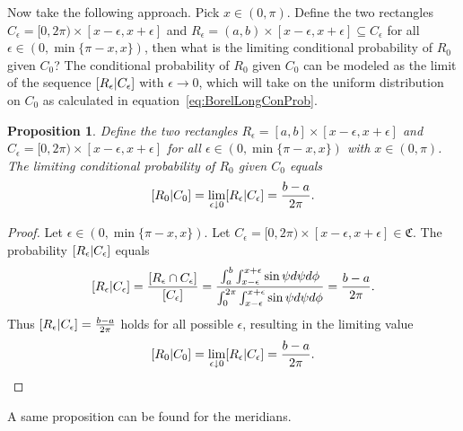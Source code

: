 \documentclass[twoside,a4paper]{report}
\theoremstyle{plain}
\newtheorem{proposition}[theorem]{Proposition}
\theoremstyle{definition}
\theoremstyle{remark}
\numberwithin{equation}{chapter}
\let\P\relax
\DeclareMathOperator{\P}{\mathbb{P}}
\DeclareMathOperator{\1}{\mathbbm{1}}
\begin{document}
Now take the following approach. Pick $x\in(0,\pi)$. Define the two rectangles $C_\epsilon=[0,2\pi)\times[x-\epsilon,x+\epsilon]$ and $R_\epsilon=(a,b)\times[x-\epsilon,x+\epsilon]\subseteq C_\epsilon$ for all ${\epsilon\in(0,\min\{\pi-x,x\})}$, then what is the limiting conditional probability of $R_0$ given $C_0$? The conditional probability of $R_0$ given $C_0$ can be modeled as the limit of the sequence $\P[R_\epsilon|C_\epsilon]$ with $\epsilon\to0$, which will take on the uniform distribution on $C_0$ as calculated in equation~\eqref{eq:BorelLongConProb}.
\begin{proposition}\label{prop:BorelLongBayes}
Define the two rectangles $R_\epsilon=[a,b]\times[x-\epsilon,x+\epsilon]$ and $C_\epsilon=[0,2\pi)\times[x-\epsilon,x+\epsilon]$ for all $\epsilon\in(0,\min\{\pi-x,x\})$ with $x\in(0,\pi)$. The limiting conditional probability of $R_0$ given $C_0$ equals
\begin{equation}
\P[R_0|C_0]=\lim_{\epsilon\downarrow0}\P[R_\epsilon|C_\epsilon]=\frac{b-a}{2\pi}.
\end{equation}
\end{proposition}
\begin{proof}
Let $\epsilon\in(0,\min\{\pi-x,x\})$. Let $C_\epsilon=[0,2\pi)\times[x-\epsilon,x+\epsilon]\in\mathfrak{C}$. The probability $\P[R_\epsilon|C_\epsilon]$ equals
\begin{equation}
\P[R_\epsilon|C_\epsilon]=\frac{\P[R_\epsilon\cap C_\epsilon]}{\P[C_\epsilon]}=\frac{\int_{a}^{b}\int_{x-\epsilon}^{x+\epsilon}\sin\psi d\psi d\phi}{\int_{0}^{2\pi}\int_{x-\epsilon}^{x+\epsilon}\sin\psi d\psi d\phi}=\frac{b-a}{2\pi}.
\end{equation}
Thus $\P[R_\epsilon|C_\epsilon]=\frac{b-a}{2\pi}$ holds for all possible $\epsilon$, resulting in the limiting value
\begin{equation}
\P[R_0|C_0]=\lim_{\epsilon\downarrow0}\P[R_\epsilon|C_\epsilon]=\frac{b-a}{2\pi}.
\end{equation}
\end{proof}

A same proposition can be found for the meridians.
\end{document}
